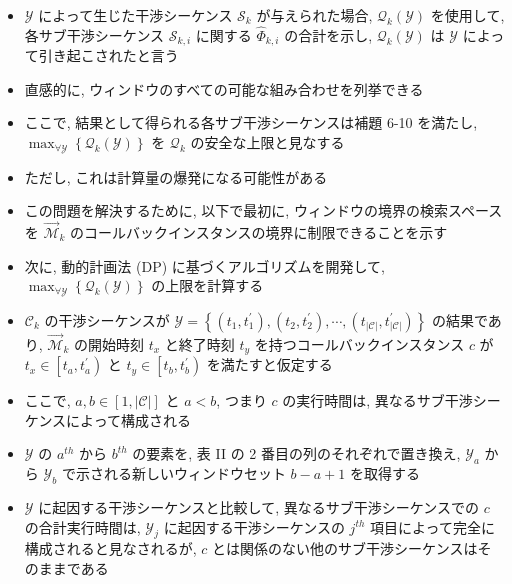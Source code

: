 \begin{frame}{}
    \begin{itemize}
        \item $\mathcal{Y}$ によって生じた干渉シーケンス $\mathcal{S}_{k}$ が与えられた場合, $\mathcal{Q}_{k}(\mathcal{Y})$ を使用して, 各サブ干渉シーケンス $\mathcal{S}_{k, i}$ に関する $\hat{\Phi}_{k, i}$ の合計を示し, $\mathcal{Q}_{k}(\mathcal{Y})$ は $\mathcal{Y}$ によって引き起こされたと言う
        \item 直感的に, ウィンドウのすべての可能な組み合わせを列挙できる
        \item ここで, 結果として得られる各サブ干渉シーケンスは補題 6-10 を満たし, $\max _{\forall \mathcal{Y}}\left\{\mathcal{Q}_{k}(\mathcal{Y})\right\}$ を $\mathcal{Q}_{k}$ の安全な上限と見なする
        \item ただし, これは計算量の爆発になる可能性がある
        \item この問題を解決するために, 以下で最初に, ウィンドウの境界の検索スペースを $\overrightarrow{\mathcal{M}}_{k}$ のコールバックインスタンスの境界に制限できることを示す
        \item 次に, 動的計画法 (DP) に基づくアルゴリズムを開発して, $\max _{\forall \mathcal{Y}}\left\{\mathcal{Q}_{k}(\mathcal{Y})\right\}$ の上限を計算する
    \end{itemize}
\end{frame}

\begin{frame}{}
    \begin{itemize}
        \item $\mathcal{C}_{k}$ の干渉シーケンスが $\mathcal{Y}=\left\{\left(t_{1}, t_{1}^{\prime}\right),\left(t_{2}, t_{2}^{\prime}\right), \cdots,\left(t_{|\mathcal{C}|}, t_{|\mathcal{C}|}^{\prime}\right)\right\}$ の結果であり, $\overrightarrow{\mathcal{M}}_{k}$ の開始時刻 $t_{x}$ と終了時刻 $t_{y}$ を持つコールバックインスタンス $c$ が $t_{x} \in\left[t_{a}, t_{a}^{\prime}\right)$ と $t_{y} \in\left[t_{b}, t_{b}^{\prime}\right)$ を満たすと仮定する
        \item ここで, $a, b \in[1,|\mathcal{C}|]$ と $a<b$, つまり $c$ の実行時間は, 異なるサブ干渉シーケンスによって構成される
        \item $\mathcal{Y}$ の $a^{t h}$ から $b^{t h}$ の要素を, 表 II の 2 番目の列のそれぞれで置き換え, $\mathcal{Y}_{a}$ から $\mathcal{Y}_{b}$ で示される新しいウィンドウセット $b-a+1$ を取得する
        \item $\mathcal{Y}$ に起因する干渉シーケンスと比較して, 異なるサブ干渉シーケンスでの $c$ の合計実行時間は, $\mathcal{Y}_{j}$ に起因する干渉シーケンスの $j^{t h}$ 項目によって完全に構成されると見なされるが, $c$ とは関係のない他のサブ干渉シーケンスはそのままである
    \end{itemize}
\end{frame}

